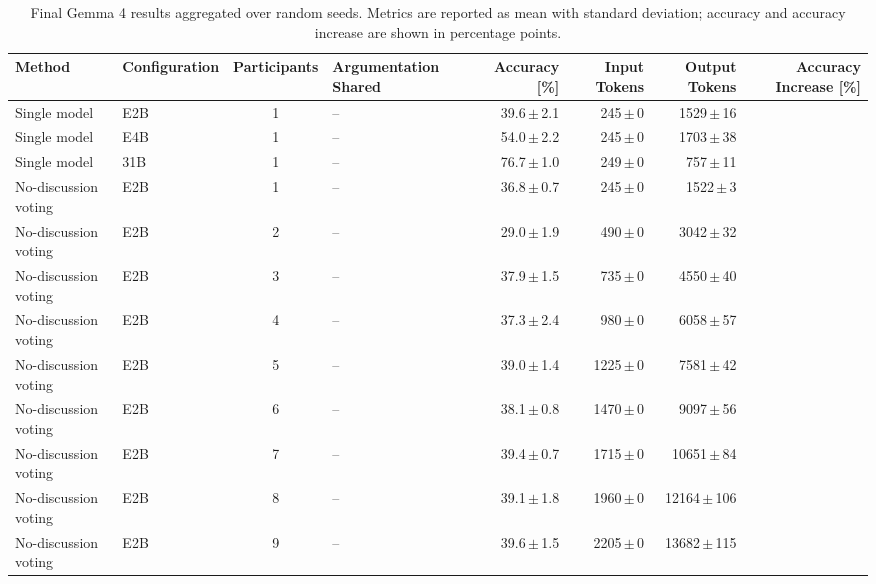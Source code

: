 \begin{table}[htbp]
\centering
\small
\caption{Final Gemma 4 results aggregated over random seeds. Metrics are reported as mean with standard deviation; accuracy and accuracy increase are shown in percentage points.}
\label{tab:final-gemma4-results}
\begin{tabular}{llclrrrr}
\toprule
Method & Configuration & Participants & Argumentation Shared & Accuracy [\%] & Input Tokens & Output Tokens & Accuracy Increase [\%] \\
\midrule
Single model & E2B & 1 & -- & 39.6{\scriptsize\,$\pm$\,2.1} & 245{\scriptsize\,$\pm$\,0} & 1529{\scriptsize\,$\pm$\,16} &  \\
Single model & E4B & 1 & -- & 54.0{\scriptsize\,$\pm$\,2.2} & 245{\scriptsize\,$\pm$\,0} & 1703{\scriptsize\,$\pm$\,38} &  \\
Single model & 31B & 1 & -- & 76.7{\scriptsize\,$\pm$\,1.0} & 249{\scriptsize\,$\pm$\,0} & 757{\scriptsize\,$\pm$\,11} &  \\
No-discussion voting & E2B & 1 & -- & 36.8{\scriptsize\,$\pm$\,0.7} & 245{\scriptsize\,$\pm$\,0} & 1522{\scriptsize\,$\pm$\,3} &  \\
No-discussion voting & E2B & 2 & -- & 29.0{\scriptsize\,$\pm$\,1.9} & 490{\scriptsize\,$\pm$\,0} & 3042{\scriptsize\,$\pm$\,32} &  \\
No-discussion voting & E2B & 3 & -- & 37.9{\scriptsize\,$\pm$\,1.5} & 735{\scriptsize\,$\pm$\,0} & 4550{\scriptsize\,$\pm$\,40} &  \\
No-discussion voting & E2B & 4 & -- & 37.3{\scriptsize\,$\pm$\,2.4} & 980{\scriptsize\,$\pm$\,0} & 6058{\scriptsize\,$\pm$\,57} &  \\
No-discussion voting & E2B & 5 & -- & 39.0{\scriptsize\,$\pm$\,1.4} & 1225{\scriptsize\,$\pm$\,0} & 7581{\scriptsize\,$\pm$\,42} &  \\
No-discussion voting & E2B & 6 & -- & 38.1{\scriptsize\,$\pm$\,0.8} & 1470{\scriptsize\,$\pm$\,0} & 9097{\scriptsize\,$\pm$\,56} &  \\
No-discussion voting & E2B & 7 & -- & 39.4{\scriptsize\,$\pm$\,0.7} & 1715{\scriptsize\,$\pm$\,0} & 10651{\scriptsize\,$\pm$\,84} &  \\
No-discussion voting & E2B & 8 & -- & 39.1{\scriptsize\,$\pm$\,1.8} & 1960{\scriptsize\,$\pm$\,0} & 12164{\scriptsize\,$\pm$\,106} &  \\
No-discussion voting & E2B & 9 & -- & 39.6{\scriptsize\,$\pm$\,1.5} & 2205{\scriptsize\,$\pm$\,0} & 13682{\scriptsize\,$\pm$\,115} &  \\

\end{tabular}
\end{table}
